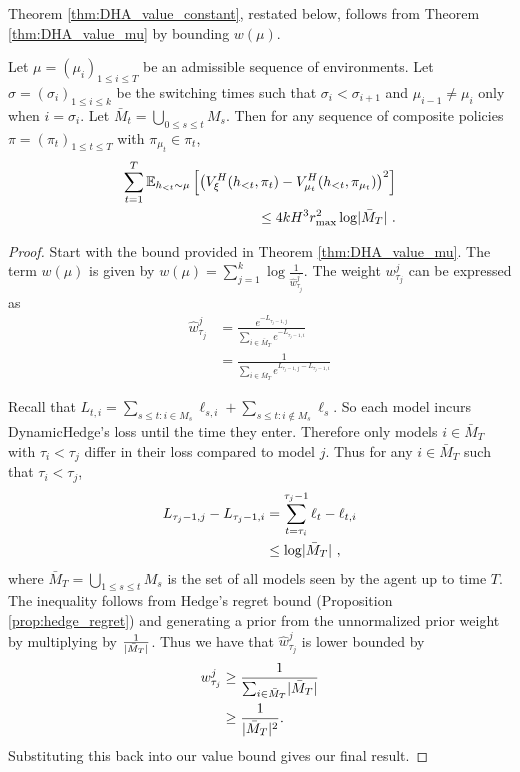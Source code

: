 Theorem \ref{thm:DHA_value_constant}, restated below, follows from Theorem \ref{thm:DHA_value_mu} by bounding $w(\mu)$.

\begin{T2}
    Let $\mu = (\mu_i)_{1 \leq i \leq T}$ be an admissible sequence of environments. Let $\sigma = (\sigma_i)_{1 \leq i \leq k}$ be the switching times such that $\sigma_i < \sigma_{i+1}$ and $\mu_{i-1} \neq \mu_{i}$ only when $i = \sigma_{i}$.
    Let $\bar{M}_t = \bigcup_{0 \leq s \leq t} M_s$. 
    Then for any sequence of composite policies $\pi = (\pi_t)_{1 \leq t \leq T}$ with $\pi_{\mu_t} \in \pi_t$,
    \begin{align}
        \sum_{t=1}^{T} \mathbb{E}_{h_{<t} \sim \mu} \left[ \left( V_{\xi}^{H}(h_{<t}, \pi_t) - V_{\mu_{t}}^{H}(h_{<t}, \pi_{\mu_{t}}) \right)^2 \right] \nonumber\\
        \leq 4 k H^3 r_{\max}^2 \log \lvert \bar{M}_T \rvert~.
    \end{align}
\end{T2}

\begin{proof}
    Start with the bound provided in Theorem \ref{thm:DHA_value_mu}. The term $w(\mu)$ is given by ${w(\mu) = \sum_{j=1}^{k} \log \frac{1}{\hat{w}_{\tau_j}^j}}$. The weight $w_{\tau_j}^j$ can be expressed as
    \begin{align*}
        \hat{w}_{\tau_j}^j &= \frac{ e^{-L_{\tau_j-1, j}} }{ \sum_{i \in \bar{M}_{T}} e^{-L_{\tau_j-1, i}} }\\
        &= \frac{ 1 }{ \sum_{i \in \bar{M}_{T}} e^{L_{\tau_j-1, j}-L_{\tau_j-1, i}} }
    \end{align*}

    Recall that $L_{t, i} = \sum_{s \leq t: i \in M_s} \ell_{s, i} + \sum_{s \leq t: i \notin M_s} \ell_s$. So each model incurs DynamicHedge's loss until the time they enter. Therefore only models $i \in \bar{M}_T$ with $\tau_i < \tau_j$ differ in their loss compared to model $j$. Thus for any $i \in \bar{M}_T$ such that $\tau_i < \tau_j$,
    \begin{align*}
        L_{\tau_j - 1, j} - L_{\tau_j - 1, i} &= \sum_{t = \tau_i}^{\tau_j - 1} \ell_t - \ell_{t,i}\\
        &\leq \log \lvert \bar{M}_T \rvert~,
    \end{align*}
    where $\bar{M}_T = \bigcup_{1 \leq s \leq t} M_s$ is the set of all models seen by the agent up to time $T$. The inequality follows from Hedge's regret bound (Proposition \ref{prop:hedge_regret}) and generating a prior from the unnormalized prior weight by multiplying by $\frac{1}{\lvert \bar{M}_T \rvert}$. Thus we have that $\hat{w}_{\tau_j}^j$ is lower bounded by
    \begin{align*}
        w_{\tau_j}^j &\geq \frac{1}{\sum_{i \in \bar{M}_T} \lvert \bar{M}_T \rvert}\\
        &\geq \frac{1}{\lvert \bar{M}_T \rvert^2}.
    \end{align*}
    Substituting this back into our value bound gives our final result.
\end{proof}



